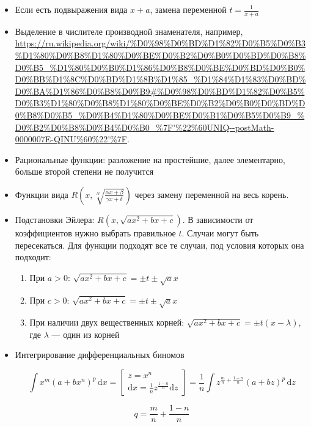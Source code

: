 \documentclass[12pt, a4paper]{article}
\begin{document}
\begin{itemize}
\begin{itemize}
      \item Если есть подвыражения вида $x + a$, замена переменной $t = \frac{1}{x + a}$
      \item Выделение в числителе производной знаменателя, например, \url{https://ru.wikipedia.org/wiki/%D0%98%D0%BD%D1%82%D0%B5%D0%B3%D1%80%D0%B8%D1%80%D0%BE%D0%B2%D0%B0%D0%BD%D0%B8%D0%B5_%D1%80%D0%B0%D1%86%D0%B8%D0%BE%D0%BD%D0%B0%D0%BB%D1%8C%D0%BD%D1%8B%D1%85_%D1%84%D1%83%D0%BD%D0%BA%D1%86%D0%B8%D0%B9#%D0%98%D0%BD%D1%82%D0%B5%D0%B3%D1%80%D0%B8%D1%80%D0%BE%D0%B2%D0%B0%D0%BD%D0%B8%D0%B5_%D0%B4%D1%80%D0%BE%D0%B1%D0%B5%D0%B9_%D0%B2%D0%B8%D0%B4%D0%B0_%7F'%22%60UNIQ--postMath-0000007E-QINU%60%22'%7F}.
      \item Рациональные функции: разложение на простейшие, далее элементарно, больше второй степени не получится
      \item Функции вида $R\left(x, \sqrt[N]{\frac{\alpha x + \beta}{\gamma x + \delta}}\right)$ через замену переменной на весь корень.
      \item Подстановки Эйлера: $R\left(x, \sqrt{ax^2 + bx + c}\right)$. В зависимости от коэффициентов нужно выбрать правильное $t$. 
      Случаи могут быть пересекаться. Для функции подходят все те случаи, под условия которых она подходит:
      \begin{enumerate}
        \item При $a > 0$: ${\sqrt {ax^{2}+bx+c}}=\pm t\pm {\sqrt {a}}x$
        \item При $c > 0$: ${ {\sqrt {ax^{2}+bx+c}}=\pm t\pm {\sqrt {a}}x}$
        \item При наличии двух вещественных корней: ${{\sqrt {ax^{2}+bx+c}}=\pm t(x-\lambda )}$, где $\lambda$ — один из корней
      \end{enumerate}
      \item Интегрирование дифференциальных биномов
      
      \begin{equation}
        \int x^{m}(a+bx^{n})^{p}\,\mathrm{d}x = \begin{bmatrix} z = x^n \\ \mathrm{d}x = \frac{1}{n} z^{\frac{1 - n}{n}} \mathrm{d}z \end{bmatrix} = \frac{1}{n} \int z^{\frac{m}{n} + \frac{1 - n}{n}}(a+bz)^{p}\,\mathrm{d}z
      \end{equation}

      \begin{equation}
        q = \frac{m}{n} + \frac{1 - n}{n}
      \end{equation}
      

\end{itemize}
\end{itemize}
\end{document}

